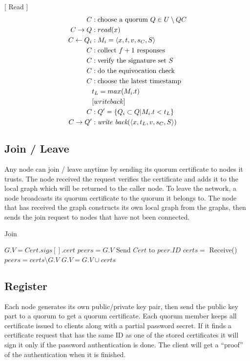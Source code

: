 \documentclass[twoside,twocolumn,10pt,fleqn]{article}
\begin{document}
[ Read ]
\setcounter{equation}{0}
\begin{align*}
  C &: \text{choose a quorum } Q \in U \setminus QC \\
  C \rightarrow Q &: read(x) \\
  C \leftarrow Q_i &: M_i = \langle x, t, v, s_C, S \rangle \\
  C &: \text{collect } f + 1 \text{ responses} \\
  C &: \text{verify the signature set $S$} \\
  C &: \text{do the equivocation check} \\
  C &: \text{choose the latest timestamp } \\
    & t_L = max(M_i.t) \\
    & [ write back ] \\
  C &: Q' = \{Q_i \subset Q | M_i.t < t_L\} \\
  C \rightarrow Q' &: \text{{\em write back}}(\langle x, t_L, v, s_C, S \rangle)
\end{align*}


\subsection{Join / Leave}
Any node can join / leave anytime by sending its quorum certificate to
nodes it trusts. The node received the request verifies the
certificate and adds it to the local graph which will be returned to
the caller node. To leave the network, a node broadcasts its quorum
certificate to the quorum it belongs to.
The node that has received the graph constructs its own local graph
from the graphs, then sends the join request to nodes that have not
been connected.

\begin{algorithm}
  \caption{Join}
  \SetAlgoNoLine
  $G.V = Cert.sigs[].cert$\;
  $peers = G.V$\;
  {
    {
      Send $Cert$ to $peer.ID$\;
      $certs = $ Receive()\;
      $peers = certs \setminus G.V$\;
      $G.V = G.V \cup certs$\;
    }
  }
\end{algorithm}

\subsection{Register}
\label{register}
Each node generates its own public/private key pair, then send the
public key part to a quorum to get a quorum certificate. Each quorum
member keeps all certificate issued to clients along with a partial
password secret. If it finds a certificate request that has the same
ID as one of the stored certificates it will sign it only if the
password authentication is done. The client will get a ``proof'' of
the authentication when it is finished.
\end{document}
